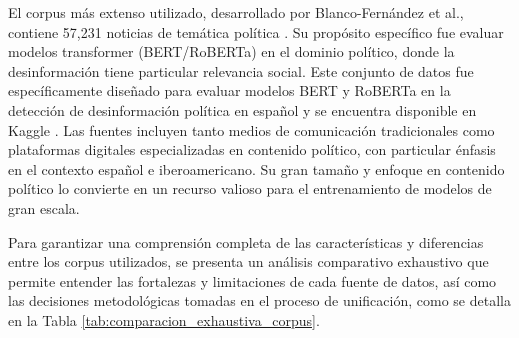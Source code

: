 El corpus más extenso utilizado, desarrollado por Blanco-Fernández et al., contiene 57,231 noticias de temática política \cite{blanco2024enhancing}. Su propósito específico fue evaluar modelos transformer (BERT/RoBERTa) en el dominio político, donde la desinformación tiene particular relevancia social. Este conjunto de datos fue específicamente diseñado para evaluar modelos BERT y RoBERTa en la detección de desinformación política en español y se encuentra disponible en Kaggle \cite{blanco2024spanish}. Las fuentes incluyen tanto medios de comunicación tradicionales como plataformas digitales especializadas en contenido político, con particular énfasis en el contexto español e iberoamericano. Su gran tamaño y enfoque en contenido político lo convierte en un recurso valioso para el entrenamiento de modelos de gran escala.

Para garantizar una comprensión completa de las características y diferencias entre los corpus utilizados, se presenta un análisis comparativo exhaustivo que permite entender las fortalezas y limitaciones de cada fuente de datos, así como las decisiones metodológicas tomadas en el proceso de unificación, como se detalla en la Tabla \ref{tab:comparacion_exhaustiva_corpus}.

